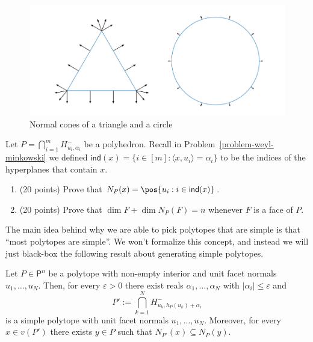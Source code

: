 \documentclass[11pt]{article}
\begin{document}
\begin{figure}[h]
\begin{center}
    \includegraphics[scale = 0.6]{../images/image9.png}
    \caption{Normal cones of a triangle and a circle}
\end{center}
\end{figure}

\begin{prob} [40 points]
    Let $P = \bigcap_{i = 1}^m H_{u_i, \alpha_i}^-$ be a polyhedron. Recall in Problem~\ref{problem-weyl-minkowski} we defined $\mathsf{ind}(x) = \{i \in [m] : \langle x, u_i \rangle = \alpha_i\}$ to be the indices of the hyperplanes that contain $x$. 
    \begin{enumerate}[label = (\alph*)]
        \item (20 points) Prove that $N_P(x) = \pos \{u_i : i \in \mathsf{ind}(x) \}$.
        \item (20 points) Prove that $\dim F + \dim N_P(F) = n$ whenever $F$ is a face of $P$. 
    \end{enumerate}
\end{prob}

The main idea behind why we are able to pick polytopes that are simple is that ``most polytopes are simple''. We won't formalize this concept, and instead we will just black-box the following result about generating simple polytopes.

\begin{thm}
    Let $P \in \mathsf{P}^n$ be a polytope with non-empty interior and unit facet normals $u_1, \ldots, u_N$. Then, for every $\varepsilon > 0$ there exist reals $\alpha_1, \ldots, \alpha_N$ with $|\alpha_i| \leq \varepsilon$ and 
    \[
        P' := \bigcap_{k = 1}^N H_{u_k, h_P(u_k) + \alpha_i}^-    
    \]
    is a simple polytope with unit facet normals $u_1, \ldots, u_N$. Moreover, for every $x \in v(P')$ there exists $y \in P$ such that $N_{P'}(x) \subseteq N_P(y)$. 
\end{thm}
\end{document}
